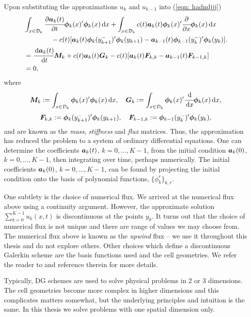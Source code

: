 Upon substituting the approximations \(u_k\) and \(u_{k-1}\) into (\ref{eqn: hadndjjj}) 
\begin{align}
	&\int_{x\in \mathcal{D}_k}\cfrac{\partial\boldsymbol a_k(t)}{\partial t}\boldsymbol \phi_k(x)'{}\boldsymbol\phi_k(x)\, \mathrm{d} x + \int_{x\in \mathcal{D}_k} c(t) \boldsymbol a_k(t)\boldsymbol\phi_k(x)'{}\cfrac{\partial}{\partial x} \boldsymbol \phi_k( x)\, \mathrm{d} x \nonumber
	\\&\qquad\qquad{}- c(t)[\boldsymbol a_k(t)\boldsymbol\phi_k(y_{k+1}^-)'{}\boldsymbol \phi_k(y_{k+1}) - \boldsymbol a_{k-1}(t)\boldsymbol\phi_{k-1}(y_{k}^-)'{}\boldsymbol \phi_k(y_{k})].\nonumber
	\\&=\cfrac{\, \mathrm{d} \boldsymbol a_k(t)}{\, \mathrm{d} t}\boldsymbol M_k + c(t) \boldsymbol a_k(t)\boldsymbol G_k - c(t)[\boldsymbol a_k(t)\boldsymbol F_{k,k} - \boldsymbol a_{k-1}(t)\boldsymbol F_{k-1,k}]\nonumber
	\\&= 0,\label{eqn: hadndj}
\end{align}
where 
\[\boldsymbol M_k := \int_{x\in\mathcal{D}_k}\boldsymbol \phi_k(x)'{}\boldsymbol \phi_k(x)\, \mathrm{d} x,\quad \boldsymbol G_k := \int_{x\in\mathcal{D}_k}\boldsymbol \phi_k(x)'{}\cfrac{\, \mathrm{d}}{\, \mathrm{d} x} \boldsymbol \phi_k(x)\, \mathrm{d} x,\]
\[\boldsymbol F_{k,k} := \boldsymbol\phi_k(y_{k+1}^-)'{}\boldsymbol \phi_k(y_{k+1}),\quad \boldsymbol F_{k-1,k} := \boldsymbol\phi_{k-1}(y_{k}^-)'{}\boldsymbol \phi_k(y_{k}),\]
and are known as the \emph{mass}, \emph{stiffness} and \emph{flux} matrices. Thus, the approximation has reduced the problem to a system of ordinary differential equations. One can determine the coefficients \(\boldsymbol a_k(t)\), \(k=0,...,K-1\), from the initial condition \(\boldsymbol a_k(0)\), \(k=0,...,K-1\), then integrating over time, perhaps numerically. The initial coefficients \(\boldsymbol a_k(0)\), \(k=0,...,K-1\), can be found by projecting the initial condition onto the basis of polynomial functions, \(\{\phi_k^r\}_{k,r}\). 

One subtlety is the choice of numerical flux. We arrived at the numerical flux above using a continuity argument. However, the approximate solution \(\sum_{k=0}^{K-1}u_k(x,t)\) is discontinuous at the points \({y_{k}}\). It turns out that the choice of numerical flux is not unique and there are range of values we may choose from. The numerical flux above is known as the \emph{upwind} flux -- we use it throughout this thesis and do not explore others. Other choices which define a discontinuous Galerkin scheme are the basis functions used and the cell geometries. We refer the reader to \citep{nodalDGBook} and reference therein for more details. 

Typically, DG schemes are used to solve physical problems in 2 or 3 dimensions. The cell geometries become more complex in higher dimensions and this complicates matters somewhat, but the underlying principles and intuition is the same. In this thesis we solve problems with one spatial dimension only.

